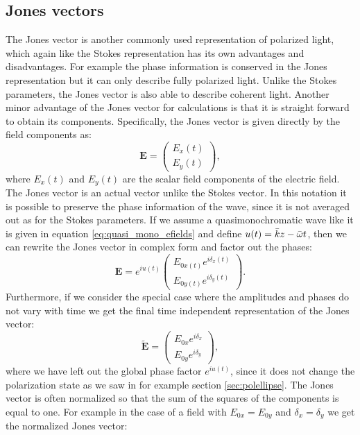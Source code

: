 \subsection{Jones vectors}
\label{sec:jones_vectors}
The Jones vector is another commonly used representation of polarized light, which again like the Stokes representation has its own advantages and disadvantages. For example the phase information is conserved in the Jones representation but it can only describe fully polarized light. Unlike the Stokes parameters, the Jones vector is also able to describe coherent light. Another minor advantage of the Jones vector for calculations is that it is straight forward to obtain its components. Specifically, the Jones vector is given directly by the field components as:
\begin{equation}
    \label{eq:jones_vector1}
    \bm{E} = 
    \begin{pmatrix}
    E_x(t) \\
    E_y(t)
    \end{pmatrix},
\end{equation}
where $E_x(t)$ and $E_y(t)$ are the scalar field components of the electric field. The Jones vector is an actual vector unlike the Stokes vector. In this notation it is possible to preserve the phase information of the wave, since it is not averaged out as for the Stokes parameters. If we assume a quasimonochromatic wave like it is given in equation \ref{eq:quasi_mono_efields} and define $u(t)=\Bar{k}z-\Bar{\omega}t$, then we can rewrite the Jones vector in complex form and factor out the phases:
\begin{equation}
    \label{eq:jones_vector2}
    \bm{E} = e^{iu(t)}
    \begin{pmatrix}
    E_{0x(t)}e^{i\delta_x(t)} \\
    E_{0y(t)}e^{i\delta_y(t)}
    \end{pmatrix}.
\end{equation}
 Furthermore, if we consider the special case where the amplitudes and phases do not vary with time we get the final time independent representation of the Jones vector:
 \begin{equation}
    \label{eq:jones_vector3}
    \bm{\tilde{E}}=
    \begin{pmatrix}
    E_{0x}e^{i\delta_x} \\
    E_{0y}e^{i\delta_y}
    \end{pmatrix},
\end{equation}
where we have left out the global phase factor $e^{iu(t)}$, since it does not change the polarization state as we saw in for example section \ref{sec:polellipse}. The Jones vector is often normalized so that the sum of the squares of the components is equal to one. For example in the case of a field with $E_{0x}=E_{0y}$ and $\delta_x=\delta_y$ we get the normalized Jones vector:
